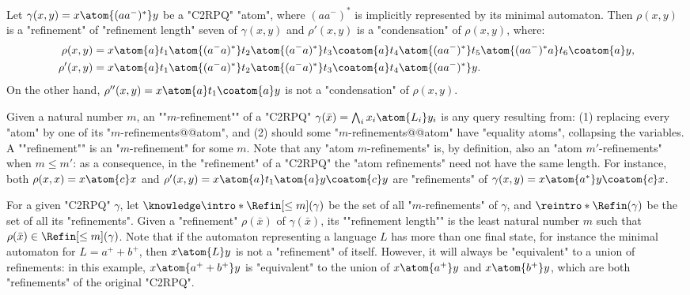 \begin{example}
    \AP\label{ex:atom-refinement-twoway}
    Let $\gamma(x,y) = x \atom{(aa^-)^*} y$ be a "C2RPQ" "atom", where
    $(aa^-)^*$ is implicitly represented by its minimal automaton.
    Then $\rho(x,y)$ is a "refinement" of "refinement length" seven of $\gamma(x,y)$
    and $\rho'(x,y)$ is a "condensation" of $\rho(x,y)$, where:
    \begin{align*}
        \rho(x,y) & = x \atom{a} t_1 \atom{(a^-a)^*} t_2 \atom{(a^-a)^*} t_3
            \coatom{a} t_4 \atom{(aa^-)^*} t_5 \atom{(aa^-)^*a} t_6 \coatom{a} y, \\
        \rho'(x,y) & = x \atom{a} t_1 \atom{(a^-a)^*} t_2 \atom{(a^-a)^*} t_3
		\coatom{a} t_4 \atom{(aa^-)^*} y. 
    \end{align*}
    On the other hand, $\rho''(x,y) = x \atom{a} t_1 \coatom{a} y$ is not
    a "condensation" of $\rho(x,y)$.
\end{example}

Given a natural number $m$, an \AP""$m$-refinement"" of a "C2RPQ" $\gamma(\bar x) = \bigwedge_{i} x_i \atom{L_i} y_i$ is any query resulting from: (1) replacing every "atom" by one of its "$m$-refinements@@atom", and (2)
should some "$m$-refinements@@atom" have "equality atoms",
collapsing the variables.
\AP A ""refinement"" is an "$m$-refinement" for some $m$.
Note that any "atom $m$-refinements" is, by definition, also an
"atom $m'$-refinements" when $m \leq m'$: as a consequence, in the "refinement" of a "C2RPQ"
the "atom refinements" need not have the same length.
For instance, both $\rho(x,x) = x \atom{c} x$ and $\rho'(x,y) = x \atom{a} t_1 \atom{a} y \coatom{c} y$ are "refinements" of $\gamma(x,y) = x \atom{a^*} y \coatom{c} x$.

For a given "C2RPQ" $\gamma$, let $\AP\intro*\Refin[\leq m](\gamma)$ be the set of all "$m$-refinements" of $\gamma$, and $\reintro*\Refin(\gamma)$ be the set of all its "refinements".
Given a "refinement" $\rho(\bar x)$ of $\gamma(\bar x)$,
its ""refinement length"" is the least natural number
$m$ such that $\rho(\bar x) \in \Refin[\leq m](\gamma)$.
Note that if the automaton representing a language $L$ has more than one final state, for instance the minimal automaton for $L = a^+ + b^+$,
then $x \atom{L} y$ is not a "refinement" of itself.
However, it will always be "equivalent" to a union of refinements: in
this example, $x \atom{a^+ + b^+} y$ is "equivalent" to the union of
$x \atom{a^+} y$ and $x \atom{b^+} y$, which are both "refinements"
of the original "C2RPQ".

